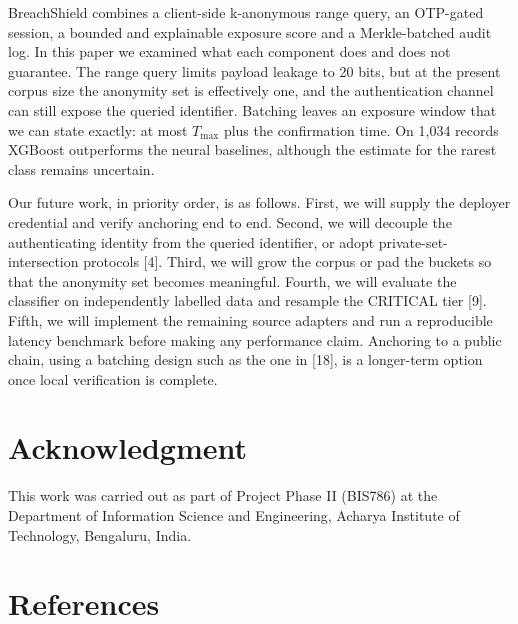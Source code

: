 \documentclass[10pt,twocolumn]{article}
\begin{document}
BreachShield combines a client-side k-anonymous range query, an OTP-gated session, a bounded and explainable exposure score and a Merkle-batched audit log. In this paper we examined what each component does and does not guarantee. The range query limits payload leakage to 20 bits, but at the present corpus size the anonymity set is effectively one, and the authentication channel can still expose the queried identifier. Batching leaves an exposure window that we can state exactly: at most $T_{\max}$ plus the confirmation time. On 1,034 records XGBoost outperforms the neural baselines, although the estimate for the rarest class remains uncertain.

Our future work, in priority order, is as follows. First, we will supply the deployer credential and verify anchoring end to end. Second, we will decouple the authenticating identity from the queried identifier, or adopt private-set-intersection protocols [4]. Third, we will grow the corpus or pad the buckets so that the anonymity set becomes meaningful. Fourth, we will evaluate the classifier on independently labelled data and resample the CRITICAL tier [9]. Fifth, we will implement the remaining source adapters and run a reproducible latency benchmark before making any performance claim. Anchoring to a public chain, using a batching design such as the one in [18], is a longer-term option once local verification is complete.

\section*{Acknowledgment}

This work was carried out as part of Project Phase II (BIS786) at the Department of Information Science and Engineering, Acharya Institute of Technology, Bengaluru, India.

\begingroup
\section*{References}
\fontsize{8}{9.4}\selectfont
\setlength{\parindent}{0pt}
\newcommand{\bref}[1]{\stepcounter{refctr}\par\hangindent=2.1em\hangafter=1\noindent\makebox[2.1em][l]{[\arabic{refctr}]}#1\par\vspace{1.5pt}}
\end{document}
